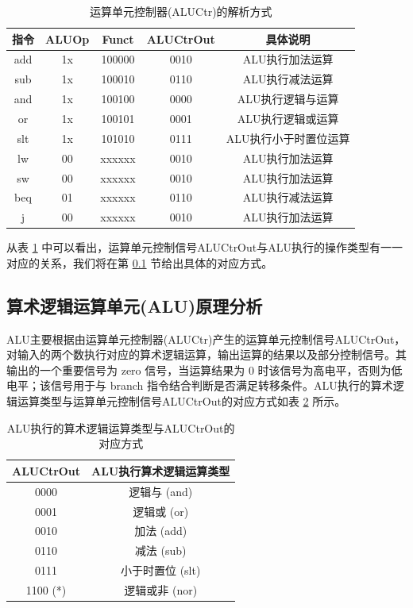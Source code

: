 \documentclass{cumcm}
\numberwithin{equation}{section}
\numberwithin{equation}{subsection}
\begin{document}
\begin{table}[htbp]
    \centering
    \begin{tabular}{|c|c|c|c|c|}
        \hline
        指令 & ALUOp & Funct & ALUCtrOut & 具体说明\\ \hline
        add & 1x & 100000 & 0010 & ALU执行加法运算\\
        sub & 1x & 100010 & 0110 & ALU执行减法运算\\
        and & 1x & 100100 & 0000 & ALU执行逻辑与运算\\
        or & 1x & 100101 & 0001 & ALU执行逻辑或运算\\
        slt & 1x & 101010 & 0111 & ALU执行小于时置位运算\\
        lw & 00 & xxxxxx & 0010 & ALU执行加法运算 \\
        sw & 00 & xxxxxx & 0010 & ALU执行加法运算 \\
        beq & 01 & xxxxxx & 0110 & ALU执行减法运算 \\
        j & 00 & xxxxxx & 0010 & ALU执行加法运算\\
        \hline
    \end{tabular}
    \caption{运算单元控制器(ALUCtr)的解析方式}
    \label{tab4}
\end{table}

从表 \ref{tab4} 中可以看出，运算单元控制信号ALUCtrOut与ALU执行的操作类型有一一对应的关系，我们将在第 \ref{section2.3} 节给出具体的对应方式。

\subsection{算术逻辑运算单元(ALU)原理分析}\label{section2.3}

ALU主要根据由运算单元控制器(ALUCtr)产生的运算单元控制信号ALUCtrOut，对输入的两个数执行对应的算术逻辑运算，输出运算的结果以及部分控制信号。其输出的一个重要信号为 zero 信号，当运算结果为 0 时该信号为高电平，否则为低电平；该信号用于与 branch 指令结合判断是否满足转移条件。ALU执行的算术逻辑运算类型与运算单元控制信号ALUCtrOut的对应方式如表 \ref{tab5} 所示。

\begin{table}[htbp]
    \centering
    \begin{tabular}{|c|c|}
         \hline
         ALUCtrOut & ALU执行算术逻辑运算类型 \\
         \hline
         0000 & 逻辑与 (and) \\
         0001 & 逻辑或 (or) \\
         0010 & 加法 (add) \\
         0110 & 减法 (sub) \\
         0111 & 小于时置位 (slt) \\
         1100 (*) & 逻辑或非 (nor) \\
         \hline
    \end{tabular}
    \caption{ALU执行的算术逻辑运算类型与ALUCtrOut的对应方式}
    \label{tab5}
\end{table}
\end{document}
